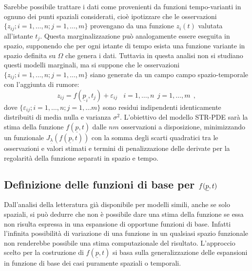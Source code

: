 \documentclass[a4paper,11pt,twoside,openright]{book}							%
\begin{document}
Sarebbe possibile trattare i dati come provenienti da funzioni tempo-varianti in ognuno dei punti spaziali considerati, cioè ipotizzare che le osservazioni $\{ z_{ij};i=1, \ldots , n; j=1, \ldots , m \}$ provengano da una funzione $z_i(t)$ valutata all'istante $t_j$. Questa marginalizzazione può analogamente essere eseguita in spazio, supponendo che per ogni istante di tempo esista una funzione variante in spazio definita su $\Omega$ che genera i dati. Tuttavia in questa analisi non si studiano questi modelli marginali, ma si suppone che le osservazioni $\{z_{ij}; i=1, \ldots , n; j=1, \ldots , m\}$ siano generate da un campo campo spazio-temporale con  l'aggiunta di rumore:
\begin{equation}
\label{eq:modellobase}
z_{ij}=f(\underline p_i,t_j)+\varepsilon_{ij}\ \ \ \ i = 1,\ldots,n\ \ j=1,\ldots,m \ \ ,
\end{equation}
dove $\{ \varepsilon_{ij}; i = 1,\ldots ,n; j=1,\ldots m\}$ sono residui indipendenti identicamente distribuiti di media nulla e varianza $\sigma^2$. L'obiettivo del modello STR-PDE sarà la stima della funzione $f(\underline p,t)$ dalle $nm$ osservazioni a disposizione, minimizzando un funzionale $J_{\underline \lambda }(f(\underline p,t))$ con la somma degli scarti quadratici tra le osservazioni e valori stimati e termini di penalizzazione delle derivate per la regolarità della funzione separati in spazio e tempo.



\subsection{Definizione delle funzioni di base per $f(\protect\underline{p},t)$}
\label{subs:basi}

Dall'analisi della letteratura già disponibile per modelli simili, anche se solo spaziali, si può dedurre che non è possibile dare una stima della funzione se essa non risulta espressa in una espansione di opportune funzioni di base. Infatti l'infinita possibilità di variazione di una funzione in un qualsiasi spazio funzionale non renderebbe possibile una stima computazionale del risultato. L'approccio scelto per la costruzione di $f(\underline p,t)$ si basa sulla generalizzazione delle espansioni in funzione di base dei casi puramente spaziali o temporali.
\end{document}
